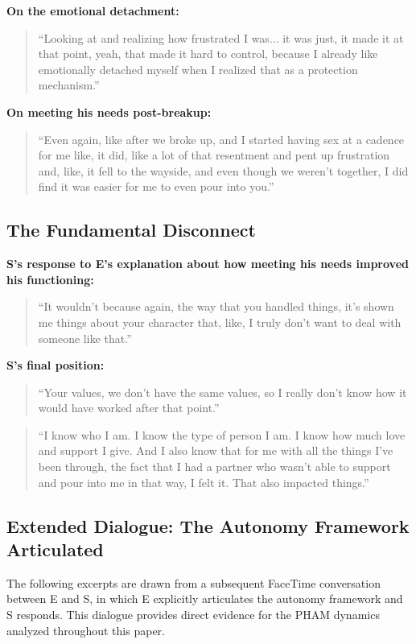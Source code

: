 \documentclass[12pt, letterpaper]{article}
\begin{document}
\textbf{On the emotional detachment:}
\begin{quote}
``Looking at and realizing how frustrated I was... it was just, it made it at that point, yeah, that made it hard to control, because I already like emotionally detached myself when I realized that as a protection mechanism.''
\end{quote}

\textbf{On meeting his needs post-breakup:}
\begin{quote}
``Even again, like after we broke up, and I started having sex at a cadence for me like, it did, like a lot of that resentment and pent up frustration and, like, it fell to the wayside, and even though we weren't together, I did find it was easier for me to even pour into you.''
\end{quote}

\subsection{The Fundamental Disconnect}

\textbf{S's response to E's explanation about how meeting his needs improved his functioning:}
\begin{quote}
``It wouldn't because again, the way that you handled things, it's shown me things about your character that, like, I truly don't want to deal with someone like that.''
\end{quote}

\textbf{S's final position:}
\begin{quote}
``Your values, we don't have the same values, so I really don't know how it would have worked after that point.''
\end{quote}

\begin{quote}
``I know who I am. I know the type of person I am. I know how much love and support I give. And I also know that for me with all the things I've been through, the fact that I had a partner who wasn't able to support and pour into me in that way, I felt it. That also impacted things.''
\end{quote}

\subsection{Extended Dialogue: The Autonomy Framework Articulated}

The following excerpts are drawn from a subsequent FaceTime conversation between E and S, in which E explicitly articulates the autonomy framework and S responds. This dialogue provides direct evidence for the PHAM dynamics analyzed throughout this paper.
\end{document}
